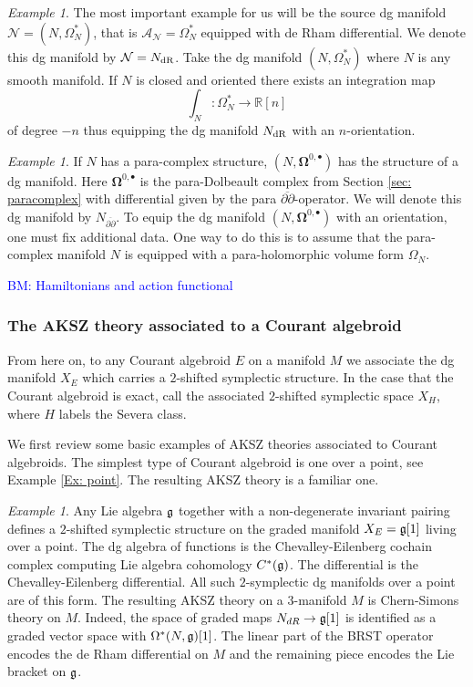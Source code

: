 \documentclass{article}
\newcommand{\RR}{\mathbb{R}}
\newcommand{\cN}{\mathcal{N}}
\newcommand{\p}{\partial}
\newcommand{\pd}{\overline{\p\!\!\!\p}}
\def\sA{\mathcal{A}}
\theoremstyle{definition}
\theoremstyle{remark}
\newtheorem{Ex}[theorem]{Example}
\def\brian{\textcolor{blue}{BM: }\textcolor{blue}}
\begin{document}
\begin{Ex}
The most important example for us will be the source dg manifold $\cN = (N, \Omega^*_N)$, that is $\sA_\cN = \Omega^*_N$ equipped with de Rham differential. 
We denote this dg manifold by $\cN = N_{\rm dR}$.
Take the dg manifold $(N, \Omega^*_N)$ where $N$ is any smooth manifold. 
If $N$ is closed and oriented there exists an integration map
\[
\int_N : \Omega^*_N \to \RR[n]
\]
of degree $-n$ thus equipping the dg manifold $N_{\rm dR}$ with an $n$-orientation. 
\end{Ex}

\begin{Ex}
If $N$ has a para-complex structure, $(N, \mathbf{\Omega}^{0,\bullet})$ has the structure of a dg manifold. 
Here $\mathbf{\Omega}^{0,\bullet}$ is the para-Dolbeault complex from Section \ref{sec: paracomplex} with differential given by the para $\pd$-operator. 
We will denote this dg manifold by $N_{\pd}$. 
To equip the dg manifold $(N, \mathbf{\Omega}^{0,\bullet})$ with an orientation, one must fix additional data. 
One way to do this is to assume that the para-complex manifold $N$ is equipped with a para-holomorphic volume form $\Omega_N$.
\end{Ex}

\brian{Hamiltonians and action functional}

\subsubsection{The AKSZ theory associated to a Courant algebroid}

From here on, to any Courant algebroid $E$ on a manifold $M$ we associate the dg manifold $X_E$ which carries a $2$-shifted symplectic structure. 
In the case that the Courant algebroid is exact, call the associated $2$-shifted symplectic space $X_H$, where $H$ labels the Severa class. 

We first review some basic examples of AKSZ theories associated to Courant algebroids. 
The simplest type of Courant algebroid is one over a point, see Example \ref{Ex: point}. 
The resulting AKSZ theory is a familiar one.

\begin{Ex}\label{ex: cs}
Any Lie algebra $\mathfrak{g}$ together with a non-degenerate invariant pairing defines a $2$-shifted symplectic structure on the graded manifold $X_E = \mathfrak{g}[1]$ living over a point. 
The dg algebra of functions is the Chevalley-Eilenberg cochain complex computing Lie algebra cohomology $C^*(\mathfrak{g})$. 
The differential is the Chevalley-Eilenberg differential.
All such $2$-symplectic dg manifolds over a point are of this form. 
The resulting AKSZ theory on a $3$-manifold $M$ is Chern-Simons theory on $M$. 
Indeed, the space of graded maps $N_{dR} \to \mathfrak{g}[1]$ is identified as a graded vector space with $\Omega^*(N, \mathfrak{g})[1]$.
The linear part of the BRST operator encodes the de Rham differential on $M$ and the remaining piece encodes the Lie bracket on $\mathfrak{g}$. 
\end{Ex}
\end{document}
